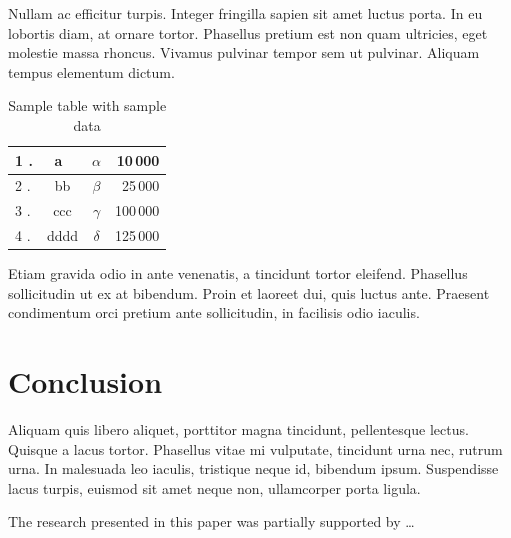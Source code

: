 \documentclass[10pt]{article}
\begin{document}
Nullam ac efficitur turpis. Integer fringilla sapien sit amet luctus porta. In eu lobortis diam, at ornare tortor. Phasellus pretium est non quam ultricies, eget molestie massa rhoncus. Vivamus pulvinar tempor sem ut pulvinar. Aliquam tempus elementum dictum.

\begin{table}[!ht]
\centering
\caption{Sample table with sample data}
\label{tabl.1}
  \begin{tabular}{|l<{.}|c|>{$}c<{$}|r|}
                                 \hline
   1 & a~   & \alpha &  10\,000\\\hline
   2 & bb   & \beta  &  25\,000\\\hline
   3 & ccc  & \gamma & 100\,000\\\hline
   4 & dddd & \delta & 125\,000\\\hline
  \end{tabular}
\end{table}

Etiam gravida odio in ante venenatis, a tincidunt tortor eleifend. Phasellus sollicitudin ut ex at bibendum. Proin et laoreet dui, quis luctus ante. Praesent condimentum orci pretium ante sollicitudin, in facilisis odio iaculis. 

\section{Conclusion}

Aliquam quis libero aliquet, porttitor magna tincidunt, pellentesque lectus. Quisque a lacus tortor. Phasellus vitae mi vulputate, tincidunt urna nec, rutrum urna. In malesuada leo iaculis, tristique neque id, bibendum ipsum. Suspendisse lacus turpis, euismod sit amet neque non, ullamcorper porta ligula.

\begin{acknowledgements}
 The research presented in this paper was partially supported by \ldots
\end{acknowledgements}

\nocite{*} %



\end{document}
